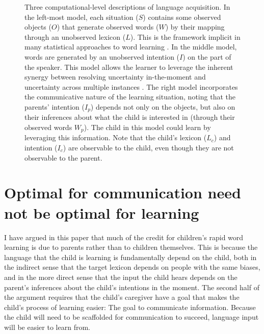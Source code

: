 \documentclass[review]{elsarticle}
\begin{document}
\begin{figure}[tb]
   	\centering
    \begin{subfigure}[b]{0.2\textwidth}
    	\centering
        \resizebox{\linewidth}{!}{}  
    \end{subfigure}
   	\hfill
    \begin{subfigure}[b]{0.2\textwidth}
    	\centering
        \resizebox{\linewidth}{!}{}  
    \end{subfigure}
    \hfill
    \begin{subfigure}[b]{0.3\textwidth}
    	\centering
        \resizebox{\linewidth}{!}{}  
    \end{subfigure}
   	

  \caption{Three computational-level descriptions of language acquisition. In the left-most model, each situation ($S$) contains some observed objects ($O$) that generate observed words ($W$) by their mapping through an unobserved lexicon ($L$). This is the framework implicit in many statistical approaches to word learning \citep[e.g.][]{siskind1996,yu2008,yurovsky2014}. In the middle model, words are generated by an unobserved intention ($I$) on the part of the speaker. This model allows the learner to leverage the inherent synergy between resolving uncertainty in-the-moment and uncertainty across multiple instances \citep{frank2009}. The right model incorporates the communicative nature of the learning situation, noting that the parents' intention ($I_{p}$) depends not only on the objects, but also on their inferences about what the child is interested in (through their observed words $W_{p}$). The child in this model could learn by leveraging this information. Note that the child's lexicon ($L_{c}$) and intention ($I_{c}$) are observable to the child, even though they are not observable to the parent.}
  \label{fig:model} 
\end{figure}


\section{Optimal for communication need not be optimal for learning}

I have argued in this paper that much of the credit for children's rapid word learning is due to parents rather than to children themselves. This is because the language that the child is learning is fundamentally depend on the child, both in the indirect sense that the target lexicon depends on people with the same biases, and in the more direct sense that the input the child hears depends on the parent's inferences about the child's intentions in the moment. The second half of the argument requires that the child's caregiver have a goal that makes the child's process of learning easier: The goal to communicate information. Because the child will need to be scaffolded for communication to succeed, language input will be easier to learn from. 
\end{document}
